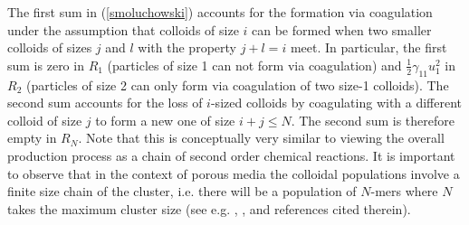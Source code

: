 \documentclass[reqno, 11pt]{amsart}
\numberwithin{equation}{section}
\begin{document}
The first sum in (\ref{smoluchowski}) accounts for the formation via coagulation under the assumption that colloids of size $i$ can be formed when two smaller colloids of sizes $j$ and $l$ with the property $j+l=i$ meet.
In particular, the first sum is zero in $R_1$ (particles of size 1 can not form via coagulation) and $\frac{1}{2}\gamma_{11}u_1^2$ in $R_2$ (particles of size 2 can only form via coagulation of two size-1 colloids).
The second sum accounts for the loss of $i$-sized colloids by coagulating with a different colloid of size $j$ to form a new one of size $i+j\leq N$. 
The second sum is therefore empty in $R_N$. Note that this is conceptually very similar to viewing the overall production process as a chain of second order chemical reactions. 
It is important to observe that in the context of porous media the colloidal populations involve a finite size chain of the cluster, i.e. there will be a population of $N$-mers where $N$ takes the maximum cluster size (see e.g.  \cite{Krehel}, \cite{NEM23}, and references cited therein).
\end{document}
